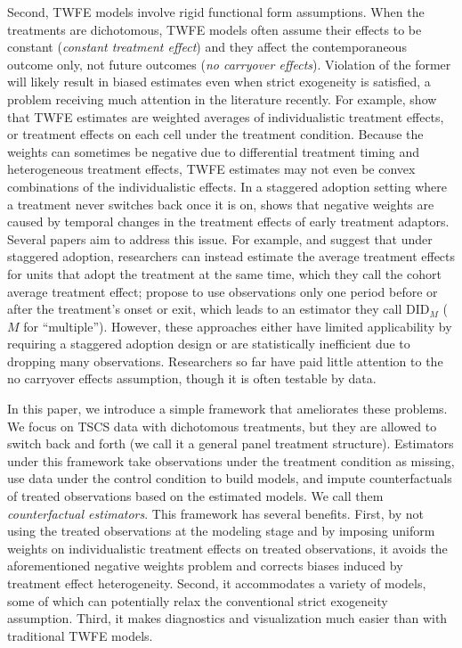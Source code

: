 \documentclass[12pt]{article}
\begin{document}
Second, TWFE models involve rigid functional form assumptions. When the treatments are dichotomous, TWFE models often assume their effects to be constant (\emph{constant treatment effect}) and they affect the contemporaneous outcome only, not future outcomes (\emph{no carryover effects}). Violation of the former will likely result in biased estimates even when strict exogeneity is satisfied, a problem receiving much attention in the literature recently. For example, \citet{de_Chaisemartin2018-iw} show that TWFE estimates are weighted averages of individualistic treatment effects, or treatment effects on each cell under the treatment condition. Because the weights can sometimes be negative due to differential treatment timing and heterogeneous treatment effects, TWFE estimates may not even be convex combinations of the individualistic effects. In a staggered adoption setting where a treatment never switches back once it is on, \citet{Goodman-Bacon2018} shows that negative weights are caused by temporal changes in the treatment effects of early treatment adaptors. Several papers aim to address this issue. For example, \citet{strezhnev2018} and \citet{callaway2020difference} suggest that under staggered adoption, researchers can instead estimate the average treatment effects for units that adopt the treatment at the same time, which they call the cohort average treatment effect; \citet{de_Chaisemartin2018-iw} propose to use observations only one period before or after the treatment’s onset or exit, which leads to an estimator they call DID$_{M}$ ($M$ for ``multiple''). However, these approaches either have limited applicability by requiring a staggered adoption design or are statistically inefficient due to dropping many observations. Researchers so far have paid little attention to the no carryover effects assumption, though it is often testable by data. 

In this paper, we introduce a simple framework that ameliorates these problems. We focus on TSCS data with dichotomous treatments, but they are allowed to switch back and forth (we call it a general panel treatment structure). Estimators under this framework take observations under the treatment condition as missing, use data under the control condition to build models, and impute counterfactuals of treated observations based on the estimated models. We call them \emph{counterfactual estimators}.  This framework has several benefits. First, by not using the treated observations at the modeling stage and by imposing uniform weights on individualistic treatment effects on treated observations, it avoids the aforementioned negative weights problem and corrects biases induced by treatment effect heterogeneity. Second, it accommodates a variety of models, some of which can potentially relax the conventional strict exogeneity assumption. Third, it makes diagnostics and visualization much easier than with traditional TWFE models.
\end{document}
